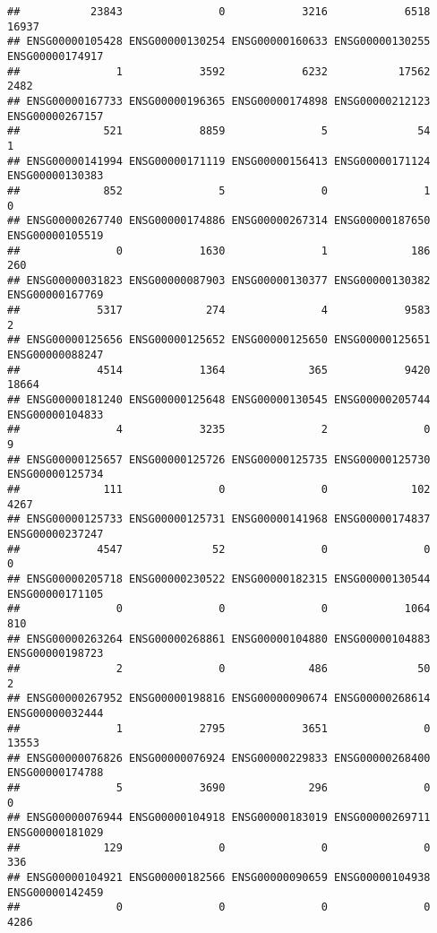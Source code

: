 \documentclass[
]{article}
\begin{document}
\begin{verbatim}
##           23843               0            3216            6518           16937 
## ENSG00000105428 ENSG00000130254 ENSG00000160633 ENSG00000130255 ENSG00000174917 
##               1            3592            6232           17562            2482 
## ENSG00000167733 ENSG00000196365 ENSG00000174898 ENSG00000212123 ENSG00000267157 
##             521            8859               5              54               1 
## ENSG00000141994 ENSG00000171119 ENSG00000156413 ENSG00000171124 ENSG00000130383 
##             852               5               0               1               0 
## ENSG00000267740 ENSG00000174886 ENSG00000267314 ENSG00000187650 ENSG00000105519 
##               0            1630               1             186             260 
## ENSG00000031823 ENSG00000087903 ENSG00000130377 ENSG00000130382 ENSG00000167769 
##            5317             274               4            9583               2 
## ENSG00000125656 ENSG00000125652 ENSG00000125650 ENSG00000125651 ENSG00000088247 
##            4514            1364             365            9420           18664 
## ENSG00000181240 ENSG00000125648 ENSG00000130545 ENSG00000205744 ENSG00000104833 
##               4            3235               2               0               9 
## ENSG00000125657 ENSG00000125726 ENSG00000125735 ENSG00000125730 ENSG00000125734 
##             111               0               0             102            4267 
## ENSG00000125733 ENSG00000125731 ENSG00000141968 ENSG00000174837 ENSG00000237247 
##            4547              52               0               0               0 
## ENSG00000205718 ENSG00000230522 ENSG00000182315 ENSG00000130544 ENSG00000171105 
##               0               0               0            1064             810 
## ENSG00000263264 ENSG00000268861 ENSG00000104880 ENSG00000104883 ENSG00000198723 
##               2               0             486              50               2 
## ENSG00000267952 ENSG00000198816 ENSG00000090674 ENSG00000268614 ENSG00000032444 
##               1            2795            3651               0           13553 
## ENSG00000076826 ENSG00000076924 ENSG00000229833 ENSG00000268400 ENSG00000174788 
##               5            3690             296               0               0 
## ENSG00000076944 ENSG00000104918 ENSG00000183019 ENSG00000269711 ENSG00000181029 
##             129               0               0               0             336 
## ENSG00000104921 ENSG00000182566 ENSG00000090659 ENSG00000104938 ENSG00000142459 
##               0               0               0               0            4286 

\end{verbatim}
\end{document}
